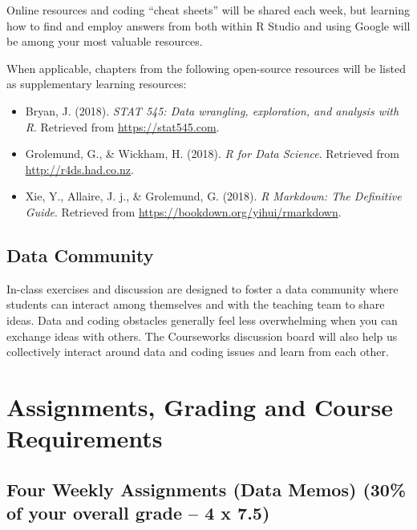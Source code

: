 \documentclass[11pt,]{article}
\providecommand{\tightlist}{%
  \setlength{\itemsep}{0pt}\setlength{\parskip}{0pt}}
\begin{document}
Online resources and coding ``cheat sheets'' will be shared each week,
but learning how to find and employ answers from both within R Studio
and using Google will be among your most valuable resources.

When applicable, chapters from the following open-source resources will
be listed as supplementary learning resources:

\begin{itemize}
\tightlist
\item
  Bryan, J. (2018). \emph{STAT 545: Data wrangling, exploration, and
  analysis with R}. Retrieved from \url{https://stat545.com}.
\item
  Grolemund, G., \& Wickham, H. (2018). \emph{R for Data Science}.
  Retrieved from \url{http://r4ds.had.co.nz}.
\item
  Xie, Y., Allaire, J. j., \& Grolemund, G. (2018). \emph{R Markdown:
  The Definitive Guide}. Retrieved from
  \url{https://bookdown.org/yihui/rmarkdown}.
\end{itemize}

\hypertarget{data-community}{%
\subsection{Data Community}\label{data-community}}

In-class exercises and discussion are designed to foster a data
community where students can interact among themselves and with the
teaching team to share ideas. Data and coding obstacles generally feel
less overwhelming when you can exchange ideas with others. The
Courseworks discussion board will also help us collectively interact
around data and coding issues and learn from each other.

\hypertarget{assignments-grading-and-course-requirements}{%
\section{Assignments, Grading and Course
Requirements}\label{assignments-grading-and-course-requirements}}

\hypertarget{four-weekly-assignments-data-memos-30-of-your-overall-grade-4-x-7.5}{%
\subsection{Four Weekly Assignments (Data Memos) (30\% of your overall
grade -- 4 x
7.5)}\label{four-weekly-assignments-data-memos-30-of-your-overall-grade-4-x-7.5}}
\end{document}
